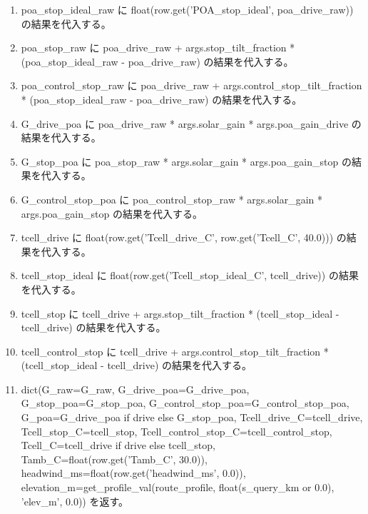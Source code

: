 \documentclass[a4paper,11pt]{article}
\begin{document}
\begin{enumerate}[leftmargin=1.8em]
\item poa\_stop\_ideal\_raw に float(row.get('POA\_stop\_ideal', poa\_drive\_raw)) の結果を代入する。
\item poa\_stop\_raw に poa\_drive\_raw + args.stop\_tilt\_fraction * (poa\_stop\_ideal\_raw - poa\_drive\_raw) の結果を代入する。
\item poa\_control\_stop\_raw に poa\_drive\_raw + args.control\_stop\_tilt\_fraction * (poa\_stop\_ideal\_raw - poa\_drive\_raw) の結果を代入する。
\item G\_drive\_poa に poa\_drive\_raw * args.solar\_gain * args.poa\_gain\_drive の結果を代入する。
\item G\_stop\_poa に poa\_stop\_raw * args.solar\_gain * args.poa\_gain\_stop の結果を代入する。
\item G\_control\_stop\_poa に poa\_control\_stop\_raw * args.solar\_gain * args.poa\_gain\_stop の結果を代入する。
\item tcell\_drive に float(row.get('Tcell\_drive\_C', row.get('Tcell\_C', 40.0))) の結果を代入する。
\item tcell\_stop\_ideal に float(row.get('Tcell\_stop\_ideal\_C', tcell\_drive)) の結果を代入する。
\item tcell\_stop に tcell\_drive + args.stop\_tilt\_fraction * (tcell\_stop\_ideal - tcell\_drive) の結果を代入する。
\item tcell\_control\_stop に tcell\_drive + args.control\_stop\_tilt\_fraction * (tcell\_stop\_ideal - tcell\_drive) の結果を代入する。
\item dict(G\_raw=G\_raw, G\_drive\_poa=G\_drive\_poa, G\_stop\_poa=G\_stop\_poa, G\_control\_stop\_poa=G\_control\_stop\_poa, G\_poa=G\_drive\_poa if drive else G\_stop\_poa, Tcell\_drive\_C=tcell\_drive, Tcell\_stop\_C=tcell\_stop, Tcell\_control\_stop\_C=tcell\_control\_stop, Tcell\_C=tcell\_drive if drive else tcell\_stop, Tamb\_C=float(row.get('Tamb\_C', 30.0)), headwind\_ms=float(row.get('headwind\_ms', 0.0)), elevation\_m=get\_profile\_val(route\_profile, float(s\_query\_km or 0.0), 'elev\_m', 0.0)) を返す。
            \end{enumerate}
\end{document}
